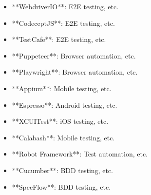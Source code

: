 \documentclass[11pt,a4paper]{article}
\begin{document}
\begin{itemize}
\item **WebdriverIO**: E2E testing, etc.
\end{itemize}

\begin{itemize}
\item **CodeceptJS**: E2E testing, etc.
\end{itemize}

\begin{itemize}
\item **TestCafe**: E2E testing, etc.
\end{itemize}

\begin{itemize}
\item **Puppeteer**: Browser automation, etc.
\end{itemize}

\begin{itemize}
\item **Playwright**: Browser automation, etc.
\end{itemize}

\begin{itemize}
\item **Appium**: Mobile testing, etc.
\end{itemize}

\begin{itemize}
\item **Espresso**: Android testing, etc.
\end{itemize}

\begin{itemize}
\item **XCUITest**: iOS testing, etc.
\end{itemize}

\begin{itemize}
\item **Calabash**: Mobile testing, etc.
\end{itemize}

\begin{itemize}
\item **Robot Framework**: Test automation, etc.
\end{itemize}

\begin{itemize}
\item **Cucumber**: BDD testing, etc.
\end{itemize}

\begin{itemize}
\item **SpecFlow**: BDD testing, etc.
\end{itemize}
\end{document}
